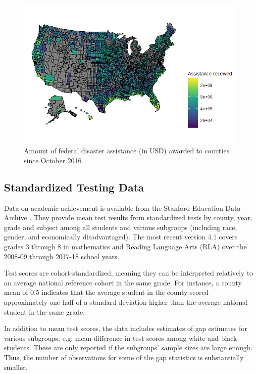 \begin{figure}[!h]
	\centering
	\includegraphics[scale=0.7]{"../Code & Data/AssistanceMap.png"}
	\caption{Amount of federal disaster assistance (in USD) awarded to counties since October 2016}
	\label{AssistanceMap}
\end{figure}




\subsection{Standardized Testing Data}

Data on academic achievement is available from the Stanford Education Data Archive \citep{SEDA}. They provide mean test results from standardized tests by county, year, grade and subject among all students and various subgroups (including race, gender, and economically disadvantaged). The most recent version 4.1 covers grades 3 through 8 in mathematics and Reading Language Arts (RLA) over the 2008-09 through 2017-18 school years.

Test scores are cohort-standardized, meaning they can be interpreted relatively to an average national reference cohort in the same grade. For instance, a county mean of 0.5 indicates that the average student in the county scored approximately one half of a standard deviation higher than the average national student in the same grade.

In addition to mean test scores, the data includes estimates of gap estimates for various subgroups, e.g. mean difference in test scores among white and black students. These are only reported if the subgroups' sample sizes are large enough. Thus, the number of observations for some of the gap statistics is substantially smaller.

